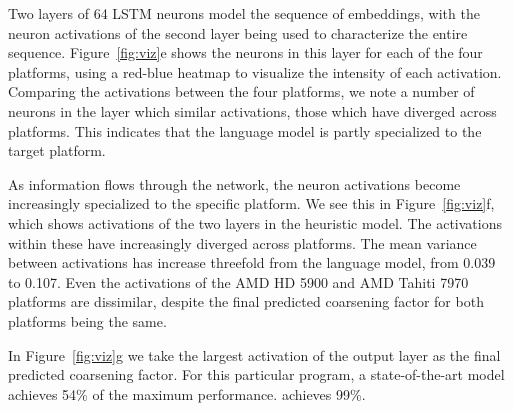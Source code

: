 Two layers of 64 LSTM neurons model the sequence of embeddings, with the neuron activations of the second layer being used to characterize the entire sequence. Figure~\ref{fig:viz}e shows the neurons in this layer for each of the four platforms, using a red-blue heatmap to visualize the intensity of each activation.
Comparing the activations between the four platforms, we note a number of neurons in the layer which similar activations, those which have diverged across platforms. This indicates that the language model is partly specialized to the target platform.

As information flows through the network, the neuron activations become increasingly specialized to the specific platform. We see this in Figure~\ref{fig:viz}f, which shows activations of the two layers in the heuristic model. The activations within these have increasingly diverged across platforms. The mean variance between activations has increase threefold from the language model, from 0.039 to 0.107. Even the activations of the AMD HD 5900 and AMD Tahiti 7970 platforms are dissimilar, despite the final predicted coarsening factor for both platforms being the same.

In Figure~\ref{fig:viz}g we take the largest activation of the output layer as the final predicted coarsening factor. For this particular program, a state-of-the-art model achieves 54\% of the maximum performance. \DeepTune achieves 99\%.
